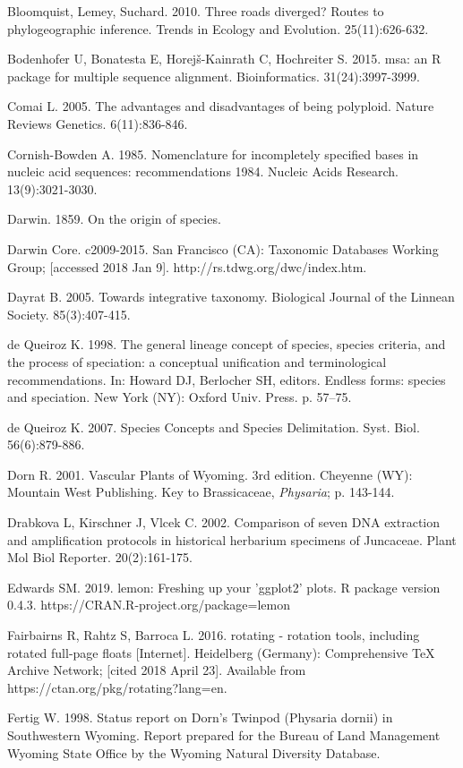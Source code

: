 Bloomquist, Lemey, Suchard. 2010. Three roads diverged? Routes to phylogeographic inference. Trends in Ecology and Evolution. 25(11):626-632.

Bodenhofer U, Bonatesta E, Horej\v{s}-Kainrath C, Hochreiter S. 2015. msa: an R package for multiple sequence alignment. Bioinformatics. 31(24):3997-3999. 

Comai L. 2005. The advantages and disadvantages of being polyploid. Nature Reviews Genetics. 6(11):836-846.

Cornish-Bowden A. 1985. Nomenclature for incompletely specified bases in nucleic acid sequences: recommendations 1984.  Nucleic Acids Research. 13(9):3021-3030.

Darwin. 1859. On the origin of species.

Darwin Core. c2009-2015. San Francisco (CA): Taxonomic Databases Working Group; [accessed 2018 Jan 9]. http://rs.tdwg.org/dwc/index.htm.

Dayrat B. 2005. Towards integrative taxonomy. Biological Journal of the Linnean Society. 85(3):407-415.

de Queiroz K. 1998. The general lineage concept of species, species criteria, and the process of speciation: a conceptual unification and terminological recommendations. In: Howard DJ, Berlocher SH, editors. Endless forms: species and speciation. New York (NY): Oxford Univ. Press. p. 57–75.

de Queiroz K. 2007. Species Concepts and Species Delimitation. Syst. Biol. 56(6):879-886.

Dorn R. 2001. Vascular Plants of Wyoming. 3rd edition. Cheyenne (WY): Mountain West Publishing. Key to Brassicaceae, \textit{Physaria}; p. 143-144.

Drabkova L, Kirschner J, Vlcek C. 2002. Comparison of seven DNA extraction and amplification protocols in historical herbarium specimens of Juncaceae. Plant Mol Biol Reporter. 20(2):161-175.

Edwards SM. 2019. lemon: Freshing up your 'ggplot2' plots. R package version 0.4.3. https://CRAN.R-project.org/package=lemon

Fairbairns R, Rahtz S, Barroca L. 2016. rotating - rotation tools, including rotated full-page floats [Internet]. Heidelberg (Germany): Comprehensive TeX Archive Network; [cited 2018 April 23]. Available from https://ctan.org/pkg/rotating?lang=en.

Fertig W. 1998. Status report on Dorn’s Twinpod (Physaria dornii) in Southwestern Wyoming. Report prepared for the Bureau of Land Management Wyoming State Office by the Wyoming Natural Diversity Database.  


